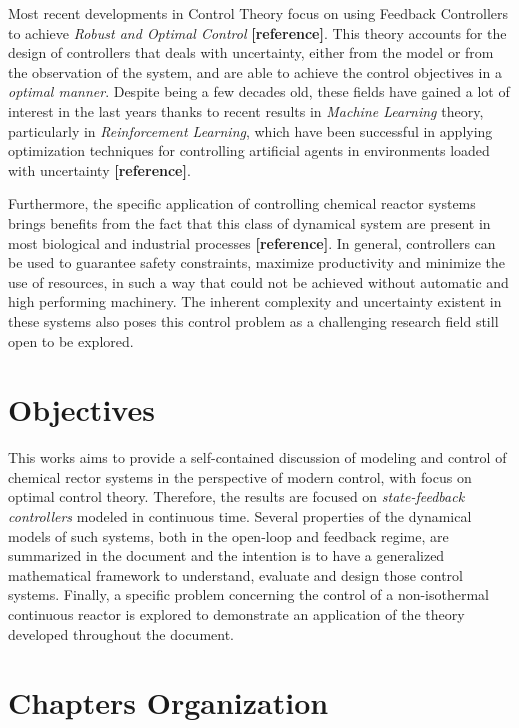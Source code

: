 \documentclass[a4paper,11pt]{book}
\numberwithin{figure}{chapter}
\numberwithin{equation}{chapter}
\numberwithin{table}{chapter}
\theoremstyle{definition}
\begin{document}
Most recent developments in Control Theory focus on using Feedback Controllers to achieve \textit{Robust and Optimal Control} \textbf{[reference]}. This theory accounts for the design of controllers that deals with uncertainty, either from the model or from the observation of the system, and are able to achieve the control objectives in a \textit{optimal manner}. Despite being a few decades old, these fields have gained a lot of interest in the last years thanks to recent results in \textit{Machine Learning} theory, particularly in \textit{Reinforcement Learning}, which have been successful in applying optimization techniques for controlling artificial agents in environments loaded with uncertainty \textbf{[reference]}.

Furthermore, the specific application of controlling chemical reactor systems brings benefits from the fact that this class of dynamical system are present in most biological and industrial processes \textbf{[reference]}. In general, controllers can be used to guarantee safety constraints, maximize productivity and minimize the use of resources, in such a way that could not be achieved without automatic and high performing machinery. The inherent complexity and uncertainty existent in these systems also poses this control problem as a challenging research field still open to be explored.

\section{Objectives}

This works aims to provide a self-contained discussion of modeling and control of chemical rector systems in the perspective of modern control, with focus on optimal control theory. Therefore, the results are focused on \textit{state-feedback controllers} modeled in continuous time. Several properties of the dynamical models of such systems, both in the open-loop and feedback regime, are summarized in the document and the intention is to have a generalized mathematical framework to understand, evaluate and design those control systems. Finally, a specific problem concerning the control of a non-isothermal continuous reactor is explored to demonstrate an application of the theory developed throughout the document.

\section{Chapters Organization}
\end{document}
